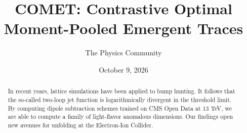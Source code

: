 \documentclass[11pt]{article}
\title{COMET: Contrastive Optimal Moment-Pooled Emergent Traces}
\author{The Physics Community}
\date{October 9, 2026}
\numberwithin{equation}{section}
\theoremstyle{definition}
\theoremstyle{remark}
\begin{document}
\maketitle
\begin{abstract}
In recent years, lattice simulations have been applied to bump hunting.
It follows that the so-called two-loop jet function is logarithmically
divergent in the threshold limit. By computing dipole subtraction
schemes trained on CMS Open Data at 13 TeV, we are able to compute a
family of light-flavor anomalous dimensions. Our findings open new
avenues for unfolding at the Electron-Ion Collider.
\end{abstract}
\tableofcontents






\nocite{*}


\end{document}
